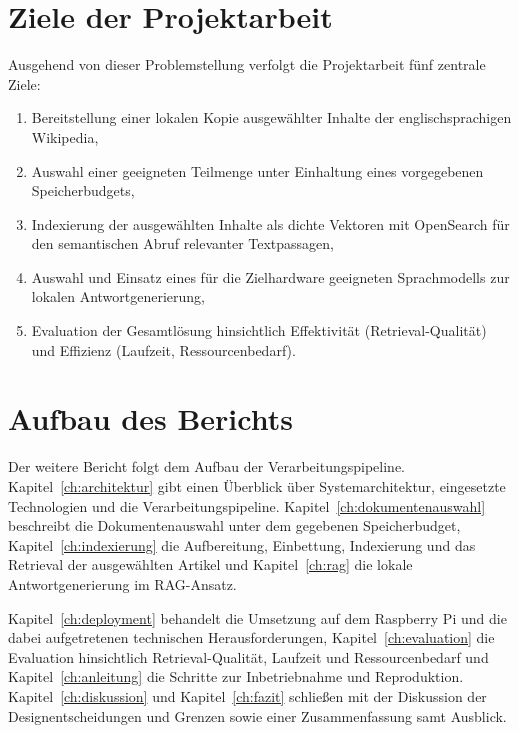 \begingroup
{}
\par\addvspace{1em}
\noindent\begin{minipage}[t]{\linewidth}
\vspace{0pt}
\section{Ziele der Projektarbeit}

Ausgehend von dieser Problemstellung verfolgt die Projektarbeit fünf zentrale
Ziele:

\begin{enumerate}
\setlength{\itemsep}{0pt}
\setlength{\parsep}{0pt}
    \item Bereitstellung einer lokalen Kopie ausgewählter Inhalte der
    englischsprachigen Wikipedia,
    \item Auswahl einer geeigneten Teilmenge unter Einhaltung eines
    vorgegebenen Speicherbudgets,
    \item Indexierung der ausgewählten Inhalte als dichte Vektoren mit
    OpenSearch für den semantischen Abruf relevanter Textpassagen,
    \item Auswahl und Einsatz eines für die Zielhardware geeigneten
    Sprachmodells zur lokalen Antwortgenerierung,
    \item Evaluation der Gesamtlösung hinsichtlich Effektivität
    (Retrieval-Qualität) und Effizienz (Laufzeit, Ressourcenbedarf).
\end{enumerate}

\end{minipage}\par\addvspace{1em}

\section{Aufbau des Berichts}

Der weitere Bericht folgt dem Aufbau der Verarbeitungspipeline.
Kapitel~\ref{ch:architektur} gibt einen Überblick über Systemarchitektur,
eingesetzte Technologien und die Verarbeitungspipeline.
Kapitel~\ref{ch:dokumentenauswahl} beschreibt die Dokumentenauswahl unter dem
gegebenen Speicherbudget, Kapitel~\ref{ch:indexierung} die Aufbereitung,
Einbettung, Indexierung und das Retrieval der ausgewählten Artikel und
Kapitel~\ref{ch:rag} die lokale Antwortgenerierung im RAG-Ansatz.

Kapitel~\ref{ch:deployment} behandelt die Umsetzung auf dem Raspberry Pi und
die dabei aufgetretenen technischen Herausforderungen,
Kapitel~\ref{ch:evaluation} die Evaluation hinsichtlich Retrieval-Qualität,
Laufzeit und Ressourcenbedarf und Kapitel~\ref{ch:anleitung} die Schritte zur
Inbetriebnahme und Reproduktion. Kapitel~\ref{ch:diskussion} und
Kapitel~\ref{ch:fazit} schließen mit der Diskussion der Designentscheidungen
und Grenzen sowie einer Zusammenfassung samt Ausblick.

\par\endgroup
